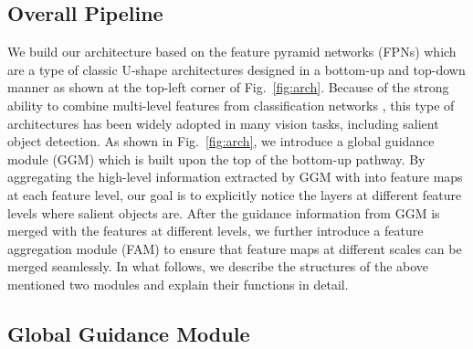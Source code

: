 \documentclass[10pt,twocolumn,letterpaper]{article}
\newcommand{\figref}[1]{Fig.~\ref{#1}}
\newcommand{\addFig}[1]{}
\newcommand{\addFigs}[1]{}
\begin{document}
\subsection{Overall Pipeline}

We build our architecture based on the feature pyramid networks (FPNs) \cite{lin2017feature}
which are a type of classic U-shape architectures designed in a bottom-up and top-down manner
as shown at the top-left corner of \figref{fig:arch}.
Because of the strong ability to combine multi-level features from 
classification networks \cite{He2016,simonyan2014very}, 
this type of architectures has been widely adopted in
many vision tasks, including salient object detection.
As shown in \figref{fig:arch}, we introduce a global guidance
module (GGM) which is built upon the top of the bottom-up pathway.
By aggregating the high-level information extracted by GGM with 
into feature maps at each feature level, our goal is to explicitly 
notice the layers at different feature levels
where salient objects are.
After the guidance information from GGM is merged with the features 
at different levels, we further introduce a feature aggregation module
(FAM) to ensure that feature maps at different scales can be 
merged seamlessly.
In what follows, we describe the structures of the above mentioned 
two modules and explain their functions in detail.


\subsection{Global Guidance Module}
\renewcommand{\addFig}[1]{\texttt{[image: sgm\_chm/\#1]}}
\renewcommand{\addFigs}[1]{\addFig{#1.jpg} & \addFig{#1.png} & 
    \addFig{#1_sal_fuse_0.png} & \addFig{#1_sal_fuse_1.png} & 
    \addFig{#1_sal_fuse_x.png} & 
    \addFig{#1_sal_fuse_2.png} & \addFig{#1_sal_fuse_3.png}}
    
\end{document}
